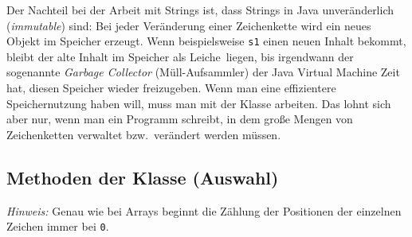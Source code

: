 \begin{framed}
Der Nachteil bei der Arbeit mit Strings ist, dass Strings in Java unveränderlich
(\emph{immutable}) sind: Bei jeder Veränderung einer Zeichenkette wird ein neues
Objekt im Speicher erzeugt. Wenn beispielsweise \lstinline|s1| einen neuen
Inhalt bekommt, bleibt der alte Inhalt im Speicher \glqq als Leiche\grqq\
liegen, bis irgendwann der sogenannte \emph{Garbage Collector}
(\glqq Müll-Aufsammler\grqq ) der Java Virtual Machine Zeit hat, diesen
Speicher wieder freizugeben. Wenn man eine effizientere Speichernutzung haben
will, muss man mit der Klasse \myClass{StringBuilder} arbeiten. Das lohnt sich
aber nur, wenn man ein Programm schreibt, in dem große Mengen von
Zeichenketten verwaltet bzw.\ verändert werden müssen.
\end{framed}

\vfill

\subsection{Methoden der Klasse  (Auswahl)}

\noindent \emph{Hinweis:} Genau wie bei Arrays beginnt die Zählung der Positionen
der einzelnen Zeichen immer bei \texttt{0}.

